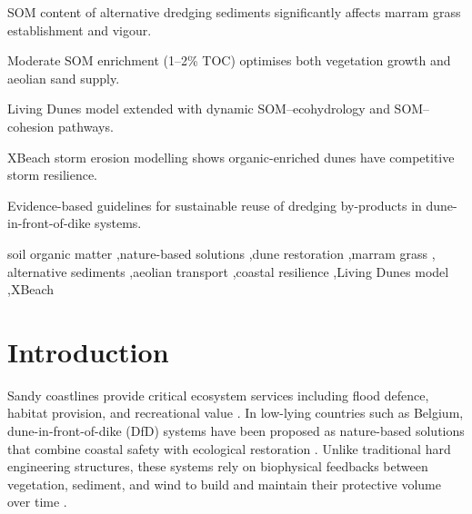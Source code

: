 \documentclass[authoryear,preprint,review,12pt]{elsarticle}
\begin{document}
\begin{frontmatter}
\begin{graphicalabstract}
\end{graphicalabstract}

\begin{highlights}
\item SOM content of alternative dredging sediments significantly affects marram grass establishment and vigour.
\item Moderate SOM enrichment (1--2\% TOC) optimises both vegetation growth and aeolian sand supply.
\item Living Dunes model extended with dynamic SOM--ecohydrology and SOM--cohesion pathways.
\item XBeach storm erosion modelling shows organic-enriched dunes have competitive storm resilience.
\item Evidence-based guidelines for sustainable reuse of dredging by-products in dune-in-front-of-dike systems.
\end{highlights}

\begin{keyword}
soil organic matter \sep nature-based solutions \sep dune restoration \sep marram grass \sep
alternative sediments \sep aeolian transport \sep coastal resilience \sep Living Dunes model \sep XBeach
\end{keyword}

\end{frontmatter}

\linenumbers

\newpage

\section{Introduction}

Sandy coastlines provide critical ecosystem services including flood defence, habitat provision, and recreational value \citep{martinez2008coastal}. In low-lying countries such as Belgium, dune-in-front-of-dike (DfD) systems have been proposed as nature-based solutions that combine coastal safety with ecological restoration \citep{temmerman2013ecosystem}. Unlike traditional hard engineering structures, these systems rely on biophysical feedbacks between vegetation, sediment, and wind to build and maintain their protective volume over time \citep{bonte2021biomorphogenic}.
\end{document}
